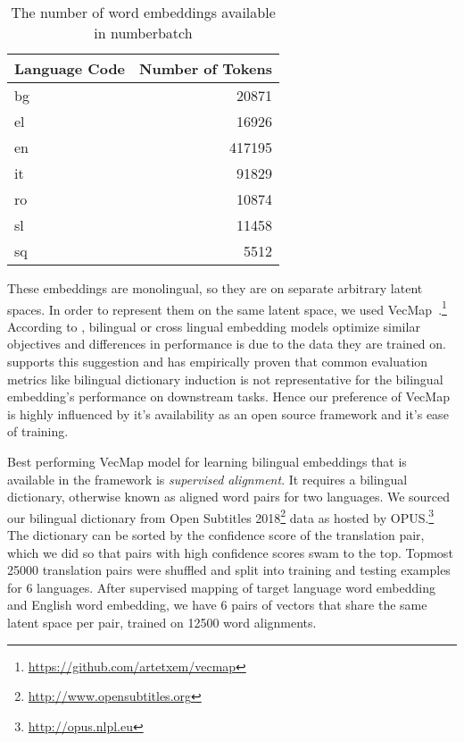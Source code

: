 \begin{table}[hbtp]
    \centering
    \begin{tabulary}{1.0\linewidth}{L R}
        \toprule
        \textbf{Language Code} & \textbf{Number of Tokens} \\
        \midrule
        bg & 20871 \\
        el & 16926 \\
        en & 417195 \\
        it & 91829 \\
        ro & 10874 \\
        sl & 11458 \\
        sq & 5512 \\
        \bottomrule
    \end{tabulary}
    \caption{The number of word embeddings available in numberbatch}%
    \label{tab:numberbatch_stats}
\end{table}

These embeddings are monolingual, so they are on separate arbitrary latent spaces.
In order to represent them on the same latent space, we used VecMap~\cite{artetxerobust2018,artetxeGeneralizing2018,artetxeLearning2017,artetxe_learning_2016}.\footnote{\url{https://github.com/artetxem/vecmap}}
According to \textcite{ruderSurvey2017}, bilingual or cross lingual embedding models optimize similar objectives and differences in performance is due to the data they are trained on.
\textcite{glavasHow2019} supports this suggestion and has empirically proven that common evaluation metrics like bilingual dictionary induction is not representative for the bilingual embedding's performance on downstream tasks.
Hence our preference of VecMap is highly influenced by it's availability as an open source framework and it's ease of training.

Best performing VecMap model for learning bilingual embeddings that is available in the framework is \emph{supervised alignment}.
It requires a bilingual dictionary, otherwise known as aligned word pairs for two languages.
We sourced our bilingual dictionary from Open Subtitles 2018\footnote{\url{http://www.opensubtitles.org}} data as hosted by OPUS.\footnote{\url{http://opus.nlpl.eu}}
The dictionary can be sorted by the confidence score of the translation pair, which we did so that pairs with high confidence scores swam to the top.
Topmost 25000 translation pairs were shuffled and split into training and testing examples for 6 languages.
After supervised mapping of target language word embedding and English word embedding, we have 6 pairs of vectors that share the same latent space per pair, trained on 12500 word alignments.


